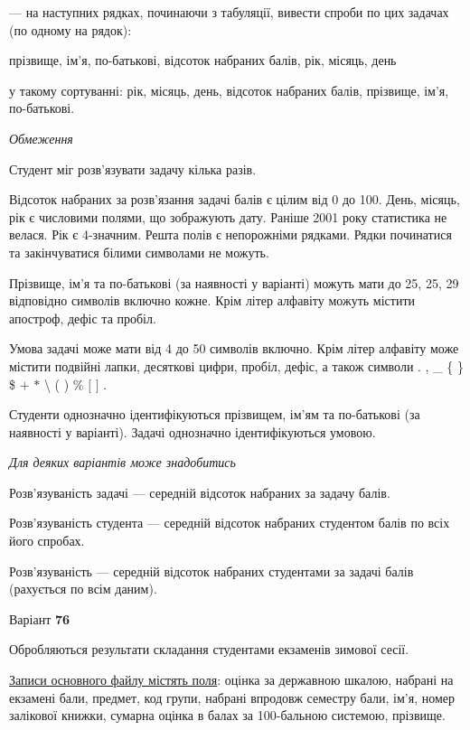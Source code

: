 \documentclass[11pt, ukrainian]{article}
\begin{document}
{\noindent}--- на наступних рядках, починаючи з табуляції, вивести спроби по цих задачах (по одному на рядок):\par
прізвище, ім’я, по-батькові, відсоток набраних балів, рік, місяць, день

{\noindent}у такому сортуванні: рік, місяць, день, відсоток набраних балів, прізвище, ім’я, по-батькові.


\bigskip\textit{Обмеження}

Студент міг розв’язувати задачу кілька разів.

Відсоток набраних за розв’язання задачі балів є цілим від 0 до 100.
День, місяць, рік є числовими полями, що зображують дату.
Раніше 2001 року статистика не велася. Рік є 4-значним.
Решта полів є непорожніми рядками.
Рядки починатися та закінчуватися білими символами не можуть.

Прізвище, ім’я та по-батькові (за наявності у варіанті) можуть мати до 25, 25, 29 відповідно символів включно кожне. 
Крім літер алфавіту можуть містити апостроф, дефіс та пробіл.

Умова задачі може мати від 4 до 50 символів включно.
Крім літер алфавіту може містити подвійні лапки, десяткові цифри, пробіл, дефіс,
а також символи . , \_ \{ \} \$ $+$ $*$ {\textbackslash} ( ) \% $[$ $]$ .

Студенти однозначно ідентифікуються прізвищем, ім’ям та по-батькові (за наявності у варіанті).
Задачі однозначно ідентифікуються умовою.

\bigskip\textit{Для деяких варіантів може знадобитись}

Розв'язуваність задачі --- середній відсоток набраних за задачу балів.

Розв'язуваність студента --- середній відсоток набраних студентом балів по всіх його спробах.

Розв'язуваність --- середній відсоток набраних студентами за задачі балів (рахується по всім даним).




\par
\newpage
{\center Варіант  \No \textbf { 76 }\par}
\bigskip
Обробляються результати складання студентами екзаменів зимової сесії.

\underline{Записи основного файлу містять поля}: оцінка за державною шкалою, набрані на екзамені бали, предмет, код групи, набрані впродовж семестру бали, ім’я, номер залікової книжки, сумарна оцінка в балах за 100-бальною системою, прізвище.
\end{document}
